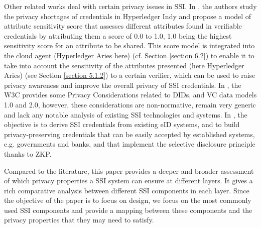 Other related works deal with certain privacy issues in SSI. In \cite{9297357}, the authors study the privacy shortages of credentials in Hyperledger Indy and propose a model of attribute sensitivity score that assesses different attributes found in verifiable credentials by attributing them a score of 0.0 to 1.0, 1.0 being the highest sensitivity score for an attribute to be shared. This score model is integrated into the cloud agent (Hyperledger Aries here) (cf. Section \ref{section 6.2}) to enable it to take into account the sensitivity of the attributes presented (here Hyperledger Aries) (see Section \ref{section 5.1.2}) to a certain verifier, which can be used to raise privacy awareness and improve the overall privacy of SSI credentials. 
In \cite{DID-Privacy, VCPrivacy, VC-Privacy}, the W3C provides some Privacy Considerations related to DIDs, and VC data models 1.0 and 2.0, however, these considerations are non-normative, remain very generic and lack any notable analysis of existing SSI technologies and systems.
In \cite{10.1007}, the objective is to derive SSI credentials from existing eID systems, and to build privacy-preserving credentials that can be easily accepted by established systems, e.g. governments and banks, and that implement the selective disclosure principle thanks to ZKP.



Compared to the literature, this paper provides a deeper and broader assessment of which privacy properties a SSI system can ensure at different layers. It gives a rich comparative analysis between different SSI components in each layer. Since the objective of the paper is to focus on design, we focus on the most commonly used SSI components and provide a mapping between these components and the privacy properties that they may need to satisfy.